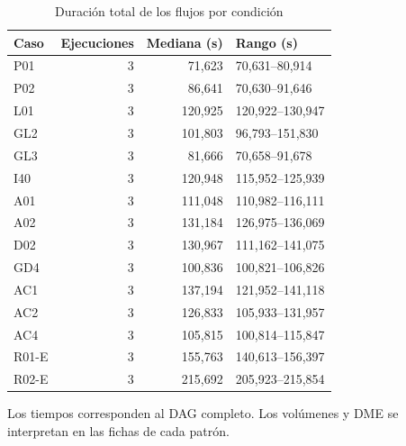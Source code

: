 \begin{table}[htbp]\centering\small
\caption{Duración total de los flujos por condición}
\label{tab:resultados}
\begin{tabular}{@{}lrrl@{}}
\toprule Caso & Ejecuciones & Mediana (s) & Rango (s)\\\midrule
P01 & 3 & 71,623 & 70,631--80,914\\
P02 & 3 & 86,641 & 70,630--91,646\\
L01 & 3 & 120,925 & 120,922--130,947\\
GL2 & 3 & 101,803 & 96,793--151,830\\
GL3 & 3 & 81,666 & 70,658--91,678\\
I40 & 3 & 120,948 & 115,952--125,939\\
A01 & 3 & 111,048 & 110,982--116,111\\
A02 & 3 & 131,184 & 126,975--136,069\\
D02 & 3 & 130,967 & 111,162--141,075\\
GD4 & 3 & 100,836 & 100,821--106,826\\
AC1 & 3 & 137,194 & 121,952--141,118\\
AC2 & 3 & 126,833 & 105,933--131,957\\
AC4 & 3 & 105,815 & 100,814--115,847\\
R01-E & 3 & 155,763 & 140,613--156,397\\
R02-E & 3 & 215,692 & 205,923--215,854\\
\bottomrule
\end{tabular}
\par\smallskip Los tiempos corresponden al DAG completo. Los volúmenes y DME se interpretan en las fichas de cada patrón.
\end{table}
